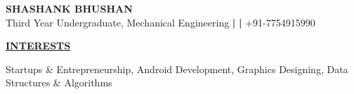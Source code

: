 \documentclass[letterpaper]{deedy-resume} %
\begin{document}

{\noindent\uppercase{\textbf{\LARGE{Shashank Bhushan}}}\\}
\hspace{73pt}Third Year Undergraduate, Mechanical Engineering \textbf{|}  \textbf{|} +91-7754915990\\
\noindent\makebox[\linewidth]{\color{headings}\rule{\paperwidth}{0.6pt}} %
\vspace{-5pt}

%
%

{\uppercase\uline{\textbf{\large{Interests}}\hfill}}
\microspace

Startups \& Entrepreneurship, Android Development, Graphics Designing, Data Structures \& Algorithms
\microspace
\end{document}
